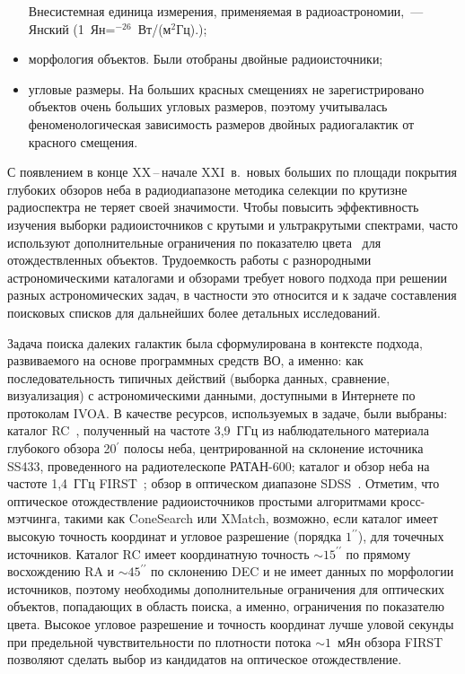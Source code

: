 \begin{multicols}{2}
\begin{itemize}
Внесистемная единица
измерения, применяемая в радиоастрономии,~--- Янский (1~Ян\;=$^{-26}$~Вт/(м$^2$Гц).);
\item морфология объектов. Были отобраны двойные радиоисточники;
\item угловые размеры. На больших красных смещениях не зарегистрировано объектов
очень больших угловых размеров, поэтому учитывалась феноменологическая
зависимость размеров двойных радиогалактик от красного смещения.
\end{itemize}

С появлением в конце XX\,--\,начале XXI~в.\ новых больших по площади покрытия
глубоких обзоров неба в радиодиапазоне методика селекции по крутизне радиоспектра не
теряет своей зна\-чи\-мости. Чтобы повысить эффективность изучения выборки
радиоисточников с крутыми и ультракрутыми спект\-ра\-ми, часто используют
дополнительные %
ограничения по показателю цвета~\cite{Madau} для отождествленных
объектов. Трудоемкость работы с разнородными астрономическими каталогами и
обзорами требует нового подхода  при решении разных астрономических задач, в
частности это относится и к задаче составления поисковых списков для дальнейших
более детальных исследований.

Задача поиска далеких галактик была сформулирована в контексте подхода, развиваемого
на основе программных средств ВО, а именно: как последо\-вательность типичных
действий (выборка данных, сравнение, визуализация) с астрономическими данными,
доступными в Интернете по протоколам IVOA. В качестве ресурсов, используемых в
задаче, были выбраны: каталог RC~\cite{Par96}, полученный на частоте 3,9~ГГц из
наблюдательного материала глубокого обзора 20$^\prime$ полосы неба, центрированной
на склонение источника SS433, проведенного на радиотелескопе РАТАН-600; каталог и
обзор неба на частоте 1,4~ГГц FIRST~\cite{Beck}; обзор в оптическом диапазоне
SDSS~\cite{Sloan}. Отметим, что оптическое отождествление радиоисточников прос\-ты\-ми
алгоритмами кросс-мэтчинга, такими как ConeSearch или XMatch, возможно, если каталог
имеет высокую точность координат и угловое разрешение (порядка $1^{\prime\prime}$),
для точечных источников. Каталог RC имеет координатную точность $\sim
15^{\prime\prime}$ по прямому восхождению RA и $\sim 45^{\prime\prime}$ по
склонению DEC и не имеет данных по морфологии источников, поэтому необходимы
дополнительные ограничения для оптических объектов, по\-па\-да\-ющих в область поиска, а
именно, ограничения по показателю цвета. Высокое угловое разрешение и точность
координат лучше уловой секунды при предельной чувствительности по плотности потока
$\sim 1$~мЯн обзора FIRST позволяют сделать выбор из кандидатов на оптическое
отождествление.


\end{multicols}
